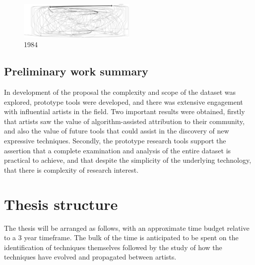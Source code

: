 \documentclass[10pt]{article}
\begin{document}
\begin{multicols*}{2}
\begin{figure}[H]
\includegraphics[width=0.5\textwidth]{1984}
\caption{1984}
\end{figure}

\subsection{Preliminary work summary}

In development of the proposal the complexity and scope of the dataset was explored, prototype tools were developed, and there was extensive engagement with influential artists in the field. Two important results were obtained, firstly that artists saw the value of algorithm-assisted attribution to their community, and also the value of future tools that could assist in the discovery of new expressive techniques. Secondly, the prototype research tools support the assertion that a complete examination and analysis of the entire dataset is practical to achieve, and that despite the simplicity of the underlying technology, that there is complexity of research interest.

\section{Thesis structure}

The thesis will be arranged as follows, with an approximate time budget relative to a 3 year timeframe. The bulk of the time is anticipated to be spent on the identification of techniques themselves followed by the study of how the techniques have evolved and propagated between artists.


\end{multicols*}
\end{document}
